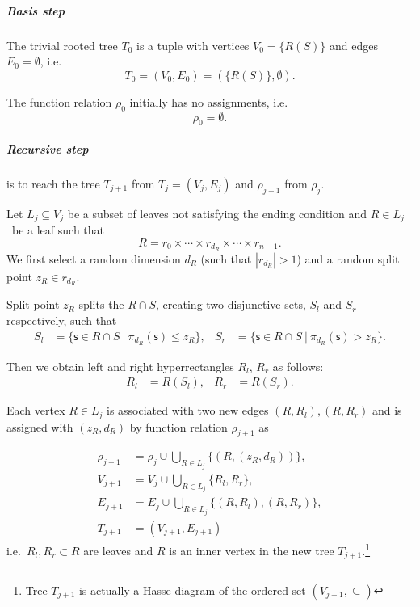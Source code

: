 \subparagraph{Basis step}

The trivial rooted tree \(T_0\) is a tuple with
vertices \(V_0 = \{R(S)\}\) and edges \(E_0 = \emptyset\), i.e. 
\[T_0= (V_0, E_0) = (\{R(S)\},\emptyset).\]

The function relation $\rho_0$ initially has no assignments, i.e.
$$\rho_0 = \emptyset.$$

\subparagraph{Recursive step}

is to reach the tree \(T_{j+1}\) from \(T_{j} = (V_j, E_j)\) and $\rho_{j+1}$ from $\rho_{j}$.

Let \(L_j \subseteq V_j\) be a subset of leaves not satisfying the
ending condition
and \(R \in L_j\)\ be a leaf such that
\[R =  r_0 \times \cdots \times r_{d_R} \times \cdots \times r_{n-1}. \]
We first select a random dimension $d_R$ (such that $|r_{d_R}| > 1$) and a random split point $z_R \in r_{d_R}$.


Split point $z_R$ splits the $R \cap S$, creating two disjunctive sets, $S_l$ and $S_r$ respectively, such that
\begin{align*}
S_l &= \{ \mathsf{s} \in{R \cap S}\ |\ \pi_{d_R}(\mathsf{s})\le z_R\},&
S_r &= \{ \mathsf{s} \in{R \cap S}\ |\ \pi_{d_R}(\mathsf{s}) > z_R\}.
\end{align*}

Then we obtain left and right hyperrectangles \(R_l\), \(R_r\) as
follows:
\begin{align*}
R_l &= R(S_l),&
R_r &= R(S_r).
\end{align*}

Each vertex \(R \in L_j\) is associated with two new
edges \((R,R_l ), (R, R_r)\) and is assigned with $(z_R,d_R)$ by function relation $\rho_{j+1}$ as


\begin{align}
   \rho_{j+1} &= \rho_j \cup \bigcup_{R \in L_j} \{(R, (z_R, d_R))\}, \\
   V_{j+1} &= V_j \cup \bigcup_{R \in L_j} \{R_l, R_r\}, \\
   E_{j+1} &= E_j \cup \bigcup_{R \in L_j} \{(R, R_l), (R,R_r)\},\\
   T_{j+1} &= (V_{j+1}, E_{j+1})
\end{align}
i.e.~${R_l, R_r} \subset R$ are leaves and $R$ is an inner vertex in the new tree
\(T_{j+1}\).\footnote{Tree \(T_{j+1}\) is actually a Hasse diagram of the ordered set
\((V_{j+1},\subseteq)\)}


